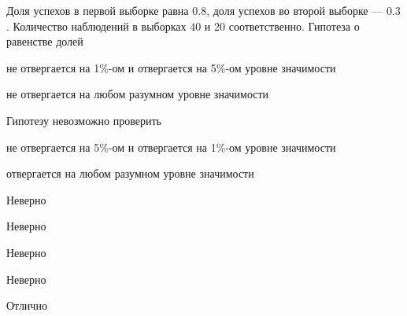 
\begin{question}
Доля успехов в первой выборке равна \(0.8\), доля успехов во второй
выборке — \(0.3\). Количество наблюдений в выборках \(40\) и \(20\)
соответственно. Гипотеза о равенстве долей
\begin{answerlist}
  \item не отвергается на 1\%-ом и отвергается на 5\%-ом уровне значимости
  \item не отвергается на любом разумном уровне значимости
  \item Гипотезу невозможно проверить
  \item не отвергается на 5\%-ом и отвергается на 1\%-ом уровне значимости
  \item отвергается на любом разумном уровне значимости
\end{answerlist}
\end{question}

\begin{solution}
\begin{answerlist}
  \item Неверно
  \item Неверно
  \item Неверно
  \item Неверно
  \item Отлично
\end{answerlist}
\end{solution}

